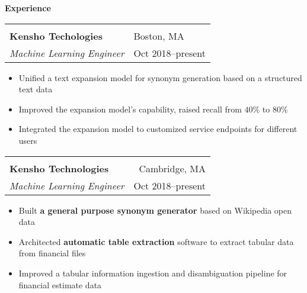 \documentclass[letterpaper,11pt,oneside]{article}
\begin{document}
 \vspace{-0.35cm}
 \raggedright
 \textbf{\Large{Experience}} \sout{\hfill} \\
 \normalsize  
\begin{flushleft}
 \vspace{-0.35cm}
 \begin{tabular}{@{} l l }
    \hspace{0.78\linewidth} & \hspace{0.1\linewidth} \\
    \textbf{Kensho Techologies} & Boston, MA \\ 
    \textit{Machine Learning Engineer} & Oct 2018--present \\ 
 \end{tabular}
 \end{flushleft}
 \begin{flushleft}
 \begin{small}
 \begin{itemize}[leftmargin=*]
 \item Unified a text expansion model for synonym generation based on a structured text data
 \item Improved the expansion model's capability, raised recall from $40\%$ to $80\%$
 \item Integrated the expansion model to customized service endpoints for different users
 \end{itemize}
 \end{small}
 \end{flushleft}
\begin{flushleft}
 \vspace{-0.45cm}
 \begin{tabular}{@{} l r@{} }
    \hspace{0.78\linewidth} & \hspace{0.2\linewidth} \\
    \textbf{Kensho Technologies} & Cambridge, MA \\ 
    \textit{Machine Learning Engineer} & Oct 2018--present \\ 
 \end{tabular}
 \end{flushleft}
 \begin{flushleft}
 \begin{small}
 \begin{itemize}[leftmargin=*]
 \item Built \textbf{a general purpose synonym generator} based on Wikipedia open data
 \item Architected \textbf{automatic table extraction} software to extract tabular data from financial files
 \item Improved a tabular information ingestion and disambiguation pipeline for financial estimate data
 \end{itemize}
 \end{small}
 \end{flushleft}
\end{document}
